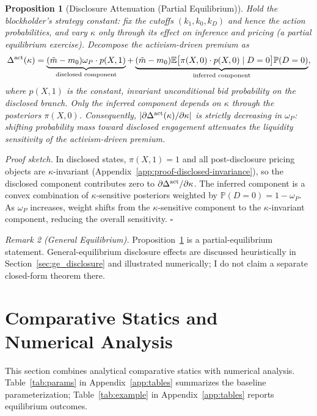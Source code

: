 \documentclass[11pt]{article}
\newtheorem{proposition}{Proposition}
\newcommand{\E}{\mathbb{E}}
\newcommand{\PP}{\mathbb{P}}
\newcommand{\1}{\mathbf{1}}
\begin{document}
\begin{proposition}[Disclosure Attenuation (Partial Equilibrium)]
\label{prop:disclosure-attenuation}
Hold the blockholder's strategy constant: fix the cutoffs $(k_1,k_0,k_D)$ and hence the action probabilities, and vary $\kappa$ only through its effect on inference and pricing (a partial equilibrium exercise). Decompose the activism-driven premium as
\[
\Delta^{\textup{act}}(\kappa) = \underbrace{(\tilde{m}-m_0)\omega_P \cdot p(X,1)}_{\text{disclosed component}} + \underbrace{(\tilde{m}-m_0)\E\big[\pi(X,0)\cdot p(X,0) \mid D=0\big]\PP(D=0)}_{\text{inferred component}},
\]
where $p(X,1)$ is the constant, invariant unconditional bid probability on the disclosed branch. Only the inferred component depends on $\kappa$ through the posteriors $\pi(X,0)$. Consequently, $|\partial \Delta^{\textup{act}}(\kappa)/\partial\kappa|$ is strictly decreasing in $\omega_P$: shifting probability mass toward disclosed engagement attenuates the liquidity sensitivity of the activism-driven premium.
\end{proposition}

\textit{Proof sketch.} In disclosed states, $\pi(X,1)=1$ and all post-disclosure pricing objects are $\kappa$-invariant (Appendix~\ref{app:proof-disclosed-invariance}), so the disclosed component contributes zero to $\partial\Delta^{\textup{act}}/\partial\kappa$. The inferred component is a convex combination of $\kappa$-sensitive posteriors weighted by $\PP(D=0)=1-\omega_P$. As $\omega_P$ increases, weight shifts from the $\kappa$-sensitive component to the $\kappa$-invariant component, reducing the overall sensitivity. \hfill$\square$

\emph{Remark 2 (General Equilibrium).} Proposition~\ref{prop:disclosure-attenuation} is a partial-equilibrium statement. General-equilibrium disclosure effects are discussed heuristically in Section~\ref{sec:ge_disclosure} and illustrated numerically; I do not claim a separate closed-form theorem there.

\section{Comparative Statics and Numerical Analysis}
\label{sec:numerical}
\label{sec:comp-statics}

This section combines analytical comparative statics with numerical analysis. Table~\ref{tab:params} in Appendix~\ref{app:tables} summarizes the baseline parameterization; Table~\ref{tab:example} in Appendix~\ref{app:tables} reports equilibrium outcomes.
\end{document}
